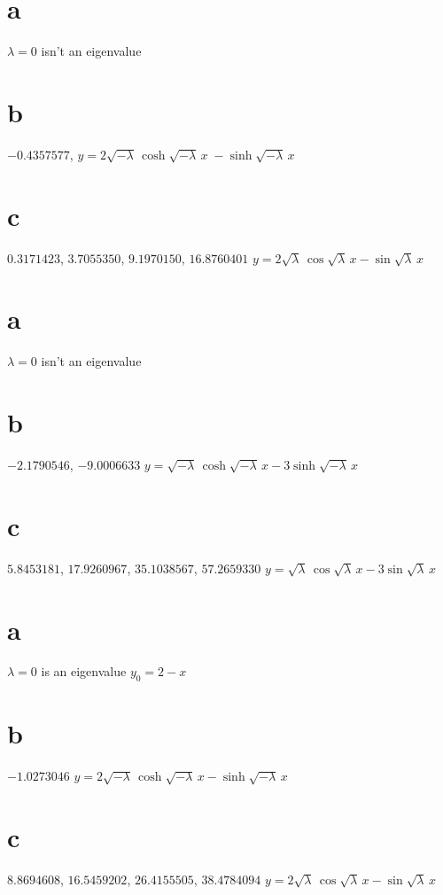 \smallskip

 \part{a} $\lambda=0$ isn't  an eigenvalue\;
 \part{b} $-0.4357577$,
$y=2\sqrt{-\lambda}\,\cosh \sqrt{-\lambda}\,x\;
-\sinh\sqrt{-\lambda}\,x$
\part{c} $0.3171423$, $3.7055350$, $9.1970150$,
 $16.8760401$\;
$y=2\sqrt{\lambda}\,\cos \sqrt{\lambda}\,x-\sin\sqrt{\lambda}\,x$
\smallskip

 \part{a} $\lambda=0$ isn't  an eigenvalue\;
\part{b} $-2.1790546$, $-9.0006633$
$y=\sqrt{-\lambda}\,\cosh\sqrt{-\lambda}\,x-3\sinh\sqrt{-\lambda}\,x$
\part{c} $5.8453181$, $17.9260967$, $35.1038567$, $57.2659330$
$y=\sqrt{\lambda}\,\cos\sqrt{\lambda}\,x-3\sin\sqrt{\lambda}\,x$

\smallskip

 \part{a} $\lambda=0$ is  an eigenvalue\;   $y_{0}=2-x$\;
 \part{b} $-1.0273046  $
$y=2\sqrt{-\lambda}\,\cosh\sqrt{-\lambda}\,x-\sinh\sqrt{-\lambda}\,x$
\part{c} $8.8694608$, $16.5459202$, $26.4155505$,
$38.4784094$
$y=2\sqrt{\lambda}\,\cos\sqrt{\lambda}\,x-\sin\sqrt{\lambda}\,x$

\smallskip

